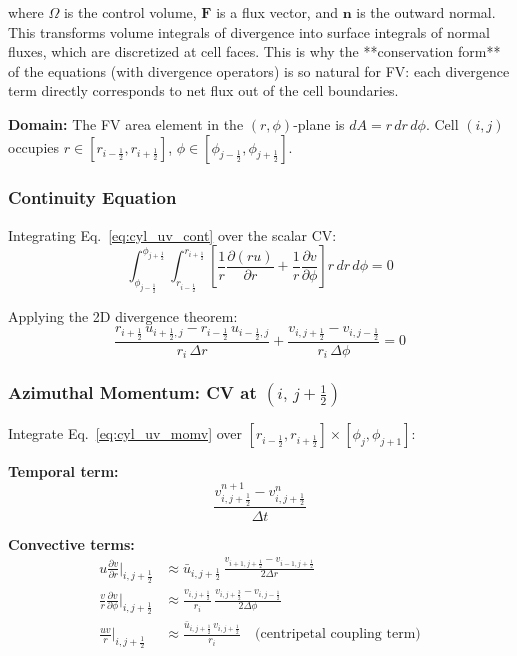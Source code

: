 where $\Omega$ is the control volume, $\mathbf{F}$ is a flux vector, and $\mathbf{n}$ is the outward normal. This transforms volume integrals of divergence into surface integrals of normal fluxes, which are discretized at cell faces. This is why the **conservation form** of the equations (with divergence operators) is so natural for FV: each divergence term directly corresponds to net flux out of the cell boundaries.

\textbf{Domain:} The FV area element in the $(r,\phi)$-plane is $dA = r\,dr\,d\phi$.
Cell $(i,j)$ occupies $r\in[r_{i-\frac{1}{2}},r_{i+\frac{1}{2}}]$,
$\phi\in[\phi_{j-\frac{1}{2}},\phi_{j+\frac{1}{2}}]$.

\subsubsection{Continuity Equation}

Integrating Eq.~\eqref{eq:cyl_uv_cont} over the scalar CV:
\begin{equation}
    \int_{\phi_{j-\frac{1}{2}}}^{\phi_{j+\frac{1}{2}}}
    \int_{r_{i-\frac{1}{2}}}^{r_{i+\frac{1}{2}}}
    \left[\frac{1}{r}\frac{\partial(ru)}{\partial r}
         +\frac{1}{r}\frac{\partial v}{\partial\phi}\right]
    r\,dr\,d\phi = 0
\end{equation}

Applying the 2D divergence theorem:
\begin{equation}
\boxed{
    \frac{r_{i+\frac{1}{2}}\,u_{i+\frac{1}{2},j} - r_{i-\frac{1}{2}}\,u_{i-\frac{1}{2},j}}{r_i\,\Delta r}
    + \frac{v_{i,j+\frac{1}{2}} - v_{i,j-\frac{1}{2}}}{r_i\,\Delta\phi} = 0
}
\label{eq:cyl_uv_disc_cont}
\end{equation}

\subsubsection{Azimuthal Momentum: CV at $(i,\,j+\tfrac{1}{2})$}

Integrate Eq.~\eqref{eq:cyl_uv_momv} over $[r_{i-\frac{1}{2}},r_{i+\frac{1}{2}}]\times[\phi_j,\phi_{j+1}]$:

\textbf{Temporal term:}
\begin{equation}
    \frac{v_{i,j+\frac{1}{2}}^{n+1}-v_{i,j+\frac{1}{2}}^{n}}{\Delta t}
\end{equation}

\textbf{Convective terms:}
\begin{align}
    u\frac{\partial v}{\partial r}\bigg|_{i,j+\frac{1}{2}}
    &\approx \bar{u}_{i,j+\frac{1}{2}}\,
      \frac{v_{i+1,j+\frac{1}{2}}-v_{i-1,j+\frac{1}{2}}}{2\Delta r}
    \\[4pt]
    \frac{v}{r}\frac{\partial v}{\partial\phi}\bigg|_{i,j+\frac{1}{2}}
    &\approx \frac{v_{i,j+\frac{1}{2}}}{r_i}\,
      \frac{v_{i,j+\frac{3}{2}}-v_{i,j-\frac{1}{2}}}{2\Delta\phi}
    \\[4pt]
    \frac{uv}{r}\bigg|_{i,j+\frac{1}{2}}
    &\approx \frac{\bar{u}_{i,j+\frac{1}{2}}\,v_{i,j+\frac{1}{2}}}{r_i}
    \quad\text{(centripetal coupling term)}
\end{align}

